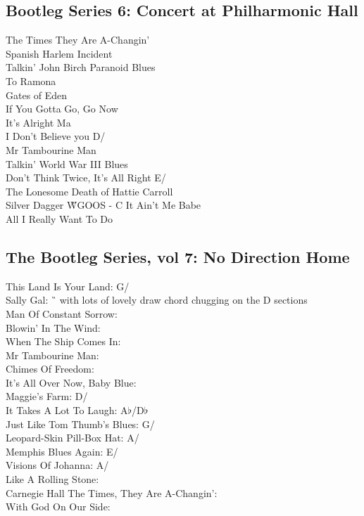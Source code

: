\begin{articlelayout}
\subsection{Bootleg Series 6: Concert at Philharmonic Hall}

The Times They Are A-Changin'  \G\\
Spanish Harlem Incident \G\\
Talkin' John Birch Paranoid Blues \G\\
To Ramona \D \\
Gates of Eden \G\\
If You Gotta Go, Go Now \G\\
It's Alright Ma \G\\
I Don't Believe you D/\G\\
Mr Tambourine Man \E \\
Talkin' World War III Blues \G\\
Don't Think Twice, It's All Right E/\A \\
The Lonesome Death of Hattie Carroll \E\\
Silver Dagger \G
WGOOS - C
It Ain't Me Babe \G\\
All I Really Want To Do \C


\subsection{The Bootleg Series, vol 7: No Direction Home}

This Land Is Your Land: G/\C \\
Sally Gal: \G\ {} with lots of lovely draw chord chugging on the D sections \\
Man Of Constant Sorrow: \G\\
Blowin' In The Wind: \D \\
When The Ship Comes In: \G\\
Mr Tambourine Man: \E \\
Chimes Of Freedom: \G\\
It's All Over Now, Baby Blue: \D \\
Maggie's Farm: D/\G\\
It Takes A Lot To Laugh: A$\flat$/D$\flat$ \\
Just Like Tom Thumb's Blues: G/\C \\
Leopard-Skin Pill-Box Hat: A/\D \\
Memphis Blues Again: E/\A \\
Visions Of Johanna: A/\D \\
Like A Rolling Stone: \C \\
Carnegie Hall The Times, They Are A-Changin': \G\\
With God On Our Side: \C


\end{articlelayout}
